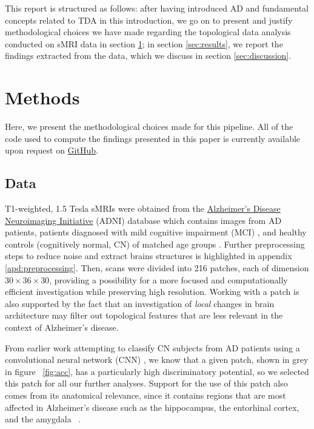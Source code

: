 \documentclass{article}
\begin{document}
This report is structured as follows: after having introduced AD and fundamental concepts related to
TDA in this introduction, we go on to present and justify methodological choices we have made
regarding the topological data analysis conducted on sMRI data in section \ref{sec:methods}; in
section \ref{sec:results}, we report the findings extracted from the data, which we discuss in
section \ref{sec:discussion}.

\section{Methods}\label{sec:methods}

Here, we present the methodological choices made for this pipeline. All of the code used to compute
the findings presented in this paper is currently available upon request on
\href{https://github.com/pjhartout/TDA_ADNI_MLCB}{GitHub}.

\subsection{Data}

T1-weighted, 1.5 Tesla sMRIs were obtained from the \href{adni.loni.usc.edu}{Alzheimer's Disease
  Neuroimaging Initiative} (ADNI) database which contains images from AD patients, patients
diagnosed with mild cognitive impairment (MCI) \citep{gauthier2006mild}, and healthy controls
(cognitively normal, CN) of matched age groups \citep{jack2008alzheimer}. Further preprocessing
steps to reduce noise and extract brains structures is highlighted in appendix
\ref{apd:preprocessing}. Then, scans were divided into 216 patches, each of dimension
$30\times36\times30$, providing a possibility for a more focused and computationally efficient
investigation while preserving high resolution. Working with a patch is also supported by the fact
that an investigation of \emph{local} changes in brain architecture may filter out topological
features that are less relevant in the context of Alzheimer's disease.

From earlier work attempting to classify CN subjects from AD patients using a convolutional neural
network (CNN) \citep{bruningk2020image}, we know that a given patch, shown in grey in figure
~\ref{fig:acc}, has a particularly high discriminatory potential, so we selected this patch for all
our further analyses. Support for the use of this patch also comes from its anatomical relevance,
since it contains regions that are most affected in Alzheimer's disease such as the
hippocampus, the entorhinal cortex, and the amygdala ~\citep{goedert2006century}.
\end{document}
